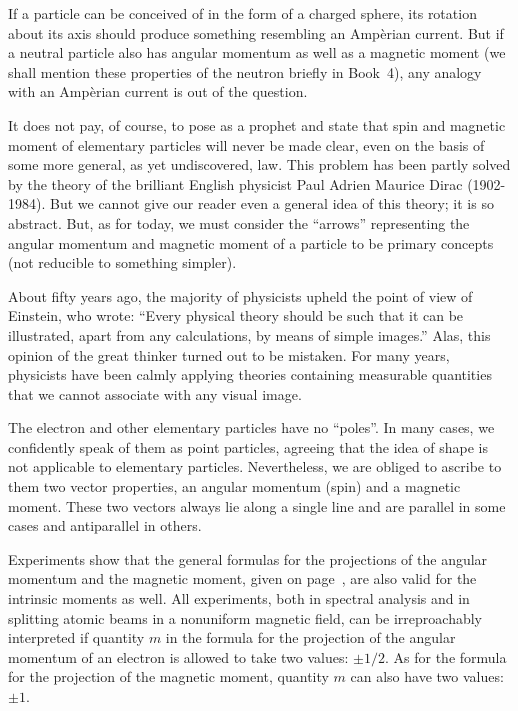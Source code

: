 If a particle can be conceived of in the form of a charged sphere, its rotation about its axis should produce something resembling an Amp\`erian current. But if a neutral particle also has angular momentum as well as a magnetic moment (we shall mention these properties of the neutron briefly in Book~4), any analogy with an Amp\`erian current is out of the question.

It does not pay, of course, to pose as a prophet and state that spin and magnetic moment of elementary particles will never be made clear, even on the basis of some more general, as yet undiscovered, law. This problem has been partly solved by the theory of the brilliant English physicist Paul Adrien Maurice Dirac (1902-1984). But we cannot give our reader even a general idea of this theory; it is so abstract. But, as for today, we must consider the ``arrows'' representing the angular momentum and magnetic moment of a particle to be primary concepts (not reducible to something simpler).

About fifty years ago, the majority of physicists upheld the point of view of Einstein, who wrote: ``Every physical theory should be such that it can be illustrated, apart from any calculations, by means of simple images.'' Alas, this opinion of the great thinker turned out to be mistaken. For many years, physicists have been calmly applying theories containing measurable quantities that we cannot associate with any visual image.

The electron and other elementary particles have no ``poles''. In many cases, we confidently speak of them as point particles, agreeing that the idea of shape is not applicable to elementary particles. Nevertheless, we are obliged to ascribe to them two vector properties, an angular momentum (spin) and a magnetic moment. These two vectors always lie along a single line and are parallel in some cases and antiparallel in others.

Experiments show that the general formulas for the projections of the angular momentum and the magnetic moment, given on page~\pageref{ang-mom}, are also valid for the intrinsic moments as well. All experiments, both in spectral analysis and in splitting atomic beams in a nonuniform magnetic field, can be irreproachably interpreted if quantity $m$ in the formula for the projection of the angular momentum of an electron is allowed to take two values: $\pm 1/2$. As for the formula for the projection of the magnetic moment, quantity $m$ can also have two values: $\pm 1$.

